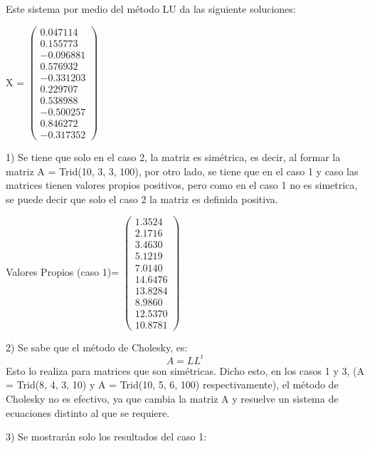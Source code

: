 \documentclass[10pt,twoside]{article}
\begin{document}
 Este sistema por medio del método LU da las siguiente soluciones: 
 
 \vspace{3mm}
 X = 
 $
 \begin{pmatrix}
 0.047114 \\
   0.155773 \\
  -0.096881 \\
   0.576932 \\
  -0.331203 \\
   0.229707 \\
   0.538988 \\
  -0.500257 \\
   0.846272 \\
  -0.317352
 \end{pmatrix}
$

 \vspace{5mm}
 
\begin{flushleft}
1) Se tiene que solo en el caso 2, la matriz es simétrica, es decir, al formar la matriz A = Trid(10, 3, 3, 100), por otro lado, se tiene que en el caso 1 y caso las matrices tienen valores propios positivos, pero como en el caso 1 no es simetrica, se puede decir que solo el caso 2 la matriz es definida positiva.
\end{flushleft}

Valores Propios (caso 1)=
 $
 \begin{pmatrix}
 1.3524 \\
    2.1716 \\
    3.4630 \\ 
    5.1219 \\
    7.0140 \\
   14.6476 \\
   13.8284 \\
    8.9860 \\
   12.5370 \\
   10.8781
 \end{pmatrix}
$

 \vspace{5mm}
 
\begin{flushleft}
2) Se sabe que el método de Cholesky, es: \[A = L L^{t}\] 
Esto lo realiza para matrices que son simétricas. Dicho esto, en los casos 1 y 3, (A = Trid(8, 4, 3, 10) y A = Trid(10, 5, 6, 100) respectivamente), el método de Cholesky no es efectivo, ya que cambia la matriz A y resuelve un sistema de ecuaciones distinto al que se requiere.

\vspace{5mm}

3) Se mostrarán solo los resultados del caso 1:
\end{flushleft}
\end{document}
